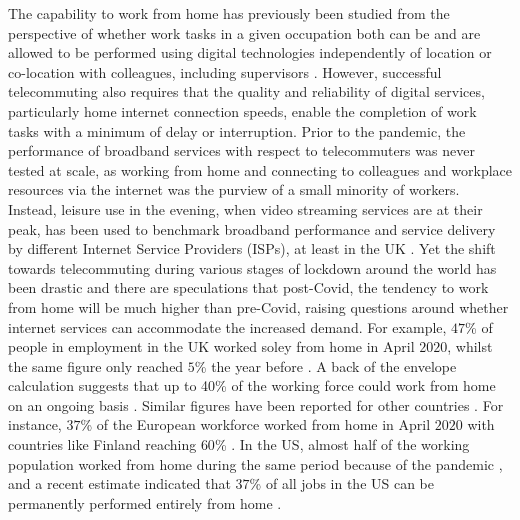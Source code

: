 \documentclass[]{interact}
\theoremstyle{plain}%
\theoremstyle{definition}
\theoremstyle{remark}
\begin{document}
The capability to work from home has previously been studied from the
perspective of whether work tasks in a given occupation both can be and
are allowed to be performed using digital technologies independently of
location or co-location with colleagues, including supervisors
\citep{allen2015effective, singh2013modeling}. However, successful
telecommuting also requires that the quality and reliability of digital
services, particularly home internet connection speeds, enable the
completion of work tasks with a minimum of delay or interruption. Prior
to the pandemic, the performance of broadband services with respect to
telecommuters was never tested at scale, as working from home and
connecting to colleagues and workplace resources via the internet was
the purview of a small minority of workers. Instead, leisure use in the
evening, when video streaming services are at their peak, has been used
to benchmark broadband performance and service delivery by different
Internet Service Providers (ISPs), at least in the UK \citep{ofcom2017}.
Yet the shift towards telecommuting during various stages of lockdown
around the world has been drastic and there are speculations that
post-Covid, the tendency to work from home will be much higher than
pre-Covid, raising questions around whether internet services can
accommodate the increased demand. For example, \(47\)\% of people in
employment in the UK worked soley from home in April \(2020\), whilst
the same figure only reached \(5\)\% the year before
\citep{ons2020, ons2020lm2019}. A back of the envelope calculation
suggests that up to 40\% of the working force could work from home on an
ongoing basis \citep{batty2020editorial}. Similar figures have been
reported for other countries \citep{felstead2020homeworking}. For
instance, \(37\)\% of the European workforce worked from home in April
\(2020\) with countries like Finland reaching \(60\)\%
\citep{eurofound2020}. In the US, almost half of the working population
worked from home during the same period because of the pandemic
\citep{brynjolfsson2020covid}, and a recent estimate indicated that
\(37\)\% of all jobs in the US can be permanently performed entirely
from home \citep{NBERw26948}.
\end{document}
